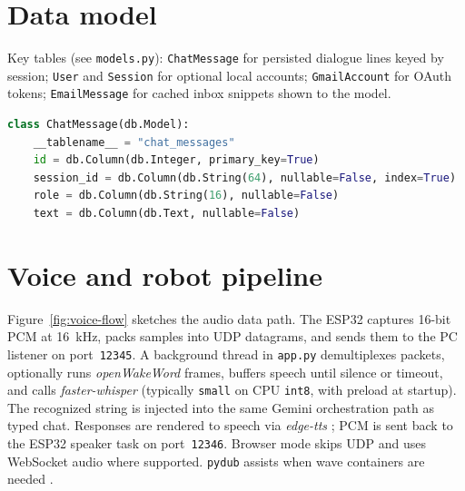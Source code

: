 \documentclass[12pt,a4paper]{report}
\begin{document}
\section{Data model}

Key tables (see \texttt{models.py}): \texttt{ChatMessage} for persisted dialogue lines keyed by session; \texttt{User} and \texttt{Session} for optional local accounts; \texttt{GmailAccount} for OAuth tokens; \texttt{EmailMessage} for cached inbox snippets shown to the model.

\begin{lstlisting}[language=Python, caption={Excerpt: chat message model (conceptual).}, label={lst:model}]
class ChatMessage(db.Model):
    __tablename__ = "chat_messages"
    id = db.Column(db.Integer, primary_key=True)
    session_id = db.Column(db.String(64), nullable=False, index=True)
    role = db.Column(db.String(16), nullable=False)
    text = db.Column(db.Text, nullable=False)
\end{lstlisting}

\section{Voice and robot pipeline}

Figure~\ref{fig:voice-flow} sketches the audio data path. The ESP32 captures 16-bit PCM at 16~kHz, packs samples into UDP datagrams, and sends them to the PC listener on port~\texttt{12345}. A background thread in \texttt{app.py} demultiplexes packets, optionally runs \textit{openWakeWord} \cite{openwakeword} frames, buffers speech until silence or timeout, and calls \textit{faster-whisper} \cite{faster-whisper, whisper} (typically \texttt{small} on CPU \texttt{int8}, with preload at startup). The recognized string is injected into the same Gemini orchestration path as typed chat. Responses are rendered to speech via \textit{edge-tts} \cite{edge-tts}; PCM is sent back to the ESP32 speaker task on port~\texttt{12346}. Browser mode skips UDP and uses WebSocket audio where supported. \texttt{pydub} assists when wave containers are needed \cite{pydub}.
\end{document}
